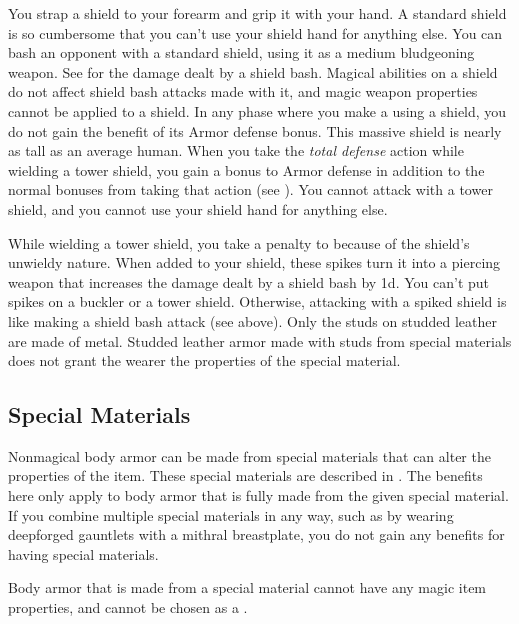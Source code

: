          You strap a shield to your forearm and grip it with your hand. A standard shield is so cumbersome that you can't use your shield hand for anything else.
        \label{Shield Bash Attacks} You can bash an opponent with a standard shield, using it as a medium bludgeoning weapon. See  for the damage dealt by a shield bash.
        Magical abilities on a shield do not affect shield bash attacks made with it, and magic weapon properties cannot be applied to a shield.
        In any phase where you make a  using a shield, you do not gain the benefit of its Armor defense bonus.
         This massive shield is nearly as tall as an average human.
        When you take the \textit{total defense} action while wielding a tower shield, you gain a  bonus to Armor defense in addition to the normal bonuses from taking that action (see ).
        You cannot attack with a tower shield, and you cannot use your shield hand for anything else.

        While wielding a tower shield, you take a  penalty to  because of the shield's unwieldy nature.
         When added to your shield, these spikes turn it into a piercing weapon that increases the damage dealt by a shield bash by \plus1d. You can't put spikes on a buckler or a tower shield. Otherwise, attacking with a spiked shield is like making a shield bash attack (see above).
         Only the studs on studded leather are made of metal.
        Studded leather armor made with studs from special materials does not grant the wearer the properties of the special material.

    \subsection{Special Materials}\label{Special Materials}
        Nonmagical body armor can be made from special materials that can alter the properties of the item.
        These special materials are described in .
        The benefits here only apply to body armor that is fully made from the given special material.
        If you combine multiple special materials in any way, such as by wearing deepforged gauntlets with a mithral breastplate, you do not gain any benefits for having special materials.

        Body armor that is made from a special material cannot have any magic item properties, and cannot be chosen as a .

